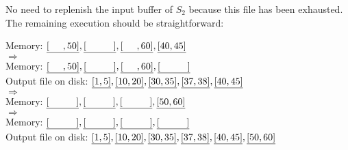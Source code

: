 \begin{sol}
\noindent No need to replenish the input buffer of $S_2$ because this file has been exhausted. The remaining execution should be straightforward:

\begin{center}
    Memory: $\uline{[\hspace{5mm}, 50]}, \uline{[\hspace{10mm}]}, \uline{[\hspace{5mm}, 60]}, \uline{[40, 45]}$ \\
    $\Rightarrow$ \\
    Memory: $\uline{[\hspace{5mm}, 50]}, \uline{[\hspace{10mm}]}, \uline{[\hspace{5mm}, 60]}, \uline{[\hspace{10mm}]}$ \\
    Output file on disk: $\uline{[1, 5]}, \uline{[10, 20]}, \uline{[30, 35]}, \uline{[37, 38]}, \uline{[40, 45]}$ \\
    $\Rightarrow$ \\
    Memory: $\uline{[\hspace{10mm}]}, \uline{[\hspace{10mm}]}, \uline{[\hspace{10mm}]}, \uline{[50, 60]}$ \\
    $\Rightarrow$ \\
    Memory: $\uline{[\hspace{10mm}]}, \uline{[\hspace{10mm}]}, \uline{[\hspace{10mm}]}, \uline{[\hspace{10mm}]}$ \\
    Output file on disk: $\uline{[1, 5]}, \uline{[10, 20]}, \uline{[30, 35]}, \uline{[37, 38]}, \uline{[40, 45]}, \uline{[50, 60]}$
\end{center}

\end{sol}




